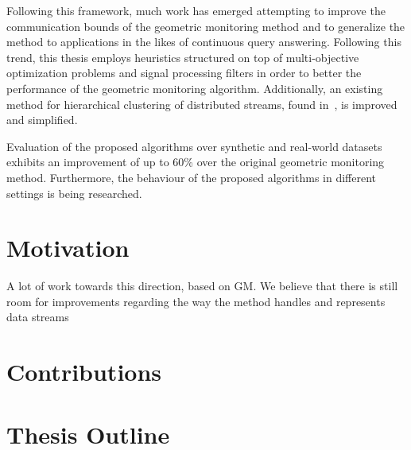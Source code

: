 Following this framework, much work has emerged attempting to improve the communication bounds of the geometric monitoring method and to generalize the method to applications in the likes of continuous query answering. Following this trend, this thesis employs heuristics structured on top of multi-objective optimization problems and signal processing filters in order to better the performance of the geometric monitoring algorithm. Additionally, an existing method for hierarchical clustering of distributed streams, found in~\cite{Sharfman2012ShapeSensGM}, is improved and simplified.

Evaluation of the proposed algorithms over synthetic and real-world datasets exhibits an improvement of up to 60\% over the original geometric monitoring method. Furthermore, the behaviour of the proposed algorithms in different settings is being researched.


\section{Motivation} \label{sec:intro-motivation}

A lot of work towards this direction, based on GM.
We believe that there is still room for improvements regarding the way the method handles and represents data streams

\section{Contributions} \label{sec:intro-contr}

\section{Thesis Outline} \label{sec:intro-thesisOutline}